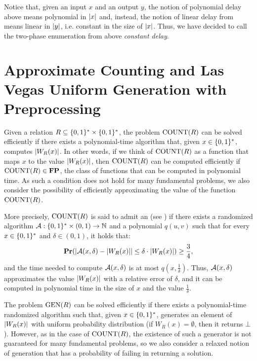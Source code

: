\documentclass[11pt,twoside=off,numbers=noenddot]{scrbook}
\begin{document}
Notice that, given an input $x$ and an output $y$, the notion of polynomial delay above means polynomial in $| x |$ and, instead, the notion of linear delay from \cite{bagan2006mso,courcelle2009linear} means linear in $| y |$, i.e. constant in the size of $| x |$. Thus, we have decided to call the two-phase enumeration from above \emph{constant delay}.

\section{Approximate Counting and Las Vegas Uniform Generation with Preprocessing}
Given a relation $R \subseteq \{ 0, 1 \}^\ast \times \{ 0, 1 \}^\ast$, the problem $\text{COUNT}(R)$ can be solved efficiently if there exists a polynomial-time algorithm that, given $x \in \{ 0, 1 \}^\ast$, computes $| W_R(x) |$. In other words, if we think of $\text{COUNT}(R)$ as a function that maps $x$ to the value $| W_R(x) |$, then $\text{COUNT}(R)$ can be computed efficiently if $\text{COUNT}(R) \in \textbf{FP}$, the class of functions that can be computed in polynomial time. As such a condition does not hold for many fundamental problems, we also consider the possibility of efficiently approximating the value of the function $\text{COUNT}(R)$.

\begin{definition}[FPRAS]
    More precisely, $\text{COUNT}(R)$ is said to admit an  (see \cite{jerrum1986random}) if there exists a randomized algorithm $\mathcal{A} : \{ 0, 1 \}^\ast \times (0, 1) \to \mathbb N$ and a polynomial $q(u, v)$ such that for every $x \in \{ 0, 1 \}^\ast$ and $\delta \in (0, 1)$, it holds that:
    \[ \textbf{Pr}(| \mathcal{A}(x, \delta) - | W_R(x) | | \leq \delta \cdot | W_R(x) |) \geq \frac{3}{4}, \]
    and the time needed to compute $\mathcal{A}(x, \delta)$ is at most $q(x, \frac{1}{\delta})$. Thus, $\mathcal{A}(x, \delta)$ approximates the value $| W_R(x) |$ with a relative error of $\delta$, and it can be computed in polynomial time in the size of $x$ and the value $\frac{1}{\delta}$.
\end{definition}

The problem $\text{GEN}(R)$ can be solved efficiently if there exists a polynomial-time randomized algorithm such that, given $x \in \{ 0, 1 \}^\ast$, generates an element of $| W_R(x) |$ with uniform probability distribution (if $W_R(x) = \emptyset$, then it returns $\bot$). However, as in the case of $\text{COUNT}(R)$, the existence of such a generator is not guaranteed for many fundamental problems, so we also consider a relaxed notion of generation that has a probability of failing in returning a solution.
\end{document}
